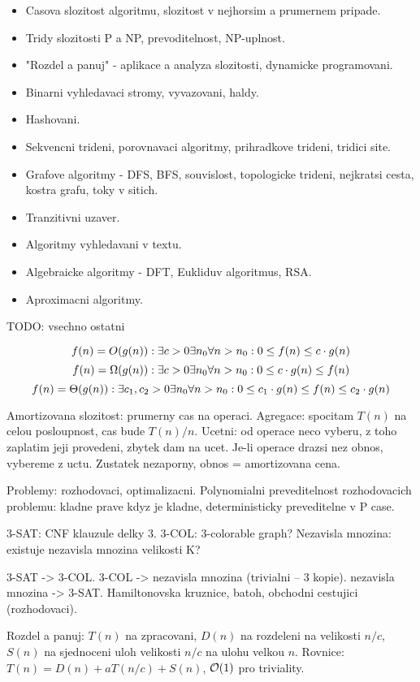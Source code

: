 \begin{itemize}
\item Casova slozitost algoritmu, slozitost v nejhorsim a prumernem pripade.
\item Tridy slozitosti P a NP, prevoditelnost, NP-uplnost.
\item "Rozdel a panuj" - aplikace a analyza slozitosti, dynamicke programovani.
\item Binarni vyhledavaci stromy, vyvazovani, haldy.
\item Hashovani.
\item Sekvencni trideni, porovnavaci algoritmy, prihradkove trideni, tridici site.
\item Grafove algoritmy - DFS, BFS, souvislost, topologicke trideni, nejkratsi cesta, kostra grafu, toky v sitich.
\item Tranzitivni uzaver.
\item Algoritmy vyhledavani v textu.
\item Algebraicke algoritmy - DFT, Eukliduv algoritmus, RSA.
\item Aproximacni algoritmy.
\end{itemize}

TODO: vsechno ostatni

$$f(n)=O(g(n)): \exists c>0 \exists n_0 \forall n>n_0: 0\leq f(n)\leq c\cdot g(n)$$
$$f(n)=\Omega(g(n)): \exists c>0 \exists n_0 \forall n>n_0: 0\leq c\cdot g(n)\leq f(n)$$
$$f(n)=\Theta(g(n)): \exists c_1,c_2>0 \exists n_0 \forall n>n_0: 0\leq c_1\cdot g(n)\leq
f(n)\leq c_2\cdot g(n)$$

Amortizovana slozitost: prumerny cas na operaci. Agregace: spocitam $T(n)$ na
celou posloupnost, cas bude $T(n)/n$.
Ucetni: od operace neco vyberu, z toho zaplatim jeji provedeni, zbytek dam na
ucet. Je-li operace drazsi nez obnos, vybereme z uctu. Zustatek nezaporny, obnos
= amortizovana cena.

Problemy: rozhodovaci, optimalizacni.
Polynomialni preveditelnost rozhodovacich problemu: kladne prave kdyz je kladne,
deterministicky preveditelne v P case.

3-SAT: CNF klauzule delky 3.
3-COL: 3-colorable graph?
Nezavisla mnozina: existuje nezavisla mnozina velikosti K?

3-SAT -> 3-COL.
3-COL -> nezavisla mnozina (trivialni -- 3 kopie).
nezavisla mnozina -> 3-SAT.
Hamiltonovska kruznice, batoh, obchodni cestujici (rozhodovaci).

Rozdel a panuj: $T(n)$ na zpracovani, $D(n)$ na rozdeleni na velikosti $n/c$,
$S(n)$ na sjednoceni uloh velikosti $n/c$ na ulohu velkou $n$.
Rovnice: $T(n)=D(n)+aT(n/c)+S(n)$, $\mathcal{O}(1)$ pro triviality.


